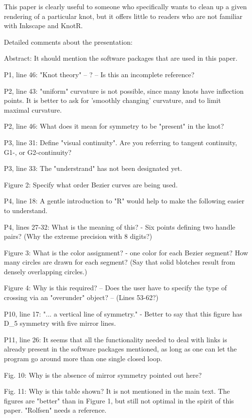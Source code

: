 This paper is clearly useful to someone who specifically wants to
clean up a given rendering of a particular knot, but it offers little
to readers who are not familiar with Inkscape and KnotR.

Detailed comments about the presentation:

Abstract: It should mention the software packages that are used in
this paper.

P1, line 46:  "Knot theory" -- ?  -- Is this an incomplete reference?

P2, line 43: "uniform" curvature is not possible, since many knots
have inflection points.  It is better to ask for 'smoothly changing'
curvature, and to limit maximal curvature.

P2, line 46: What does it mean for symmetry to be "present" in the
knot?

P3, line 31: Define "visual continuity".  Are you referring to tangent
continuity, G1-, or G2-continuity?

P3, line 33:  The "understrand" has not been designated yet.

Figure 2:  Specify what order Bezier curves are being used.

P4, line 18: A gentle introduction to "R" would help to make the
following easier to understand.

P4, lines 27-32: What is the meaning of this? - Six points defining
two handle pairs?  (Why the extreme precision with 8 digits?)

Figure 3: What is the color assignment? - one color for each Bezier
segment?  How many circles are drawn for each segment?  (Say that
solid blotches result from densely overlapping circles.)

Figure 4: Why is this required?  -- Does the user have to specify the
type of crossing via an "overunder" object?  -- (Lines 53-62?)

P10, line 17: "... a vertical line of symmetry." - Better to say that
this figure has D_5 symmetry with five mirror lines.

P11, line 26: It seems that all the functionality needed to deal with
links is already present in the software packages mentioned, as long
as one can let the program go around more than one single closed loop.

Fig. 10: Why is the absence of mirror symmetry pointed out here?

Fig. 11: Why is this table shown?  It is not mentioned in the main
text.  The figures are "better" than in Figure 1, but still not
optimal in the spirit of this paper.  "Rolfsen" needs a reference.

